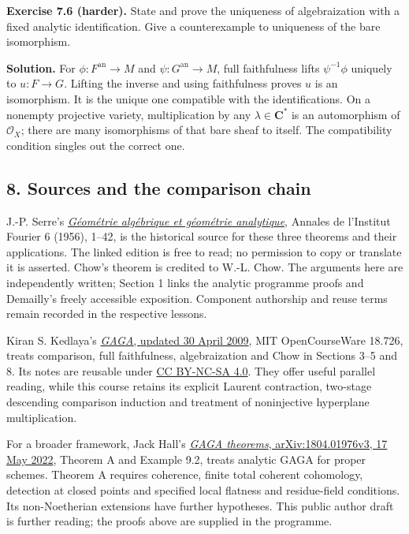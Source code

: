 \documentclass[11pt]{article}
\begin{document}
\textbf{Exercise 7.6 (harder).} State and prove the uniqueness of
algebraization with a fixed analytic identification. Give a
counterexample to uniqueness of the bare isomorphism.

\textbf{Solution.} For \(\phi:F^{\mathrm{an}}\to M\) and
\(\psi:G^{\mathrm{an}}\to M\), full faithfulness lifts \(\psi^{-1}\phi\)
uniquely to \(u:F\to G\). Lifting the inverse and using faithfulness
proves \(u\) is an isomorphism. It is the unique one compatible with the
identifications. On a nonempty projective variety, multiplication by any
\(\lambda\in\mathbf C^*\) is an automorphism of \(\mathcal O_X\); there
are many isomorphisms of that bare sheaf to itself. The compatibility
condition singles out the correct one.

\subsection{8. Sources and the comparison
chain}\label{sources-and-the-comparison-chain}

J.-P. Serre's
\href{https://www.numdam.org/item/AIF_1956__6__1_0/}{\emph{Géométrie
algébrique et géométrie analytique}}, Annales de l'Institut Fourier 6
(1956), 1--42, is the historical source for these three theorems and
their applications. The linked edition is free to read; no permission to
copy or translate it is asserted. Chow's theorem is credited to W.-L.
Chow. The arguments here are independently written; Section 1 links the
analytic programme proofs and Demailly's freely accessible exposition.
Component authorship and reuse terms remain recorded in the respective
lessons.

Kiran S. Kedlaya's
\href{https://ocw.mit.edu/courses/18-726-algebraic-geometry-spring-2009/resources/mit18_726s09_lec22_gaga/}{\emph{GAGA},
updated 30 April 2009}, MIT OpenCourseWare 18.726, treats comparison,
full faithfulness, algebraization and Chow in Sections 3--5 and 8. Its
notes are reusable under
\href{https://ocw.mit.edu/pages/privacy-and-terms-of-use/}{CC BY-NC-SA
4.0}. They offer useful parallel reading, while this course retains its
explicit Laurent contraction, two-stage descending comparison induction
and treatment of noninjective hyperplane multiplication.

For a broader framework, Jack Hall's
\href{https://arxiv.org/abs/1804.01976v3}{\emph{GAGA theorems},
arXiv:1804.01976v3, 17 May 2022}, Theorem A and Example 9.2, treats
analytic GAGA for proper schemes. Theorem A requires coherence, finite
total coherent cohomology, detection at closed points and specified
local flatness and residue-field conditions. Its non-Noetherian
extensions have further hypotheses. This public author draft is further
reading; the proofs above are supplied in the programme.
\end{document}
